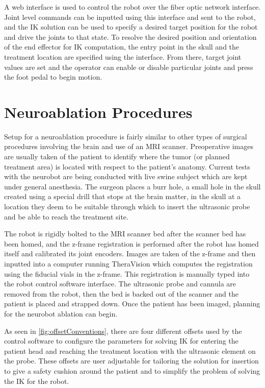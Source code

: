 \documentclass[12pt]{report}
\begin{document}
A web interface is used to control the robot over the fiber optic network interface. Joint level commands can be inputted using this interface and sent to the robot, and the IK solution can be used to specify a desired target position for the robot and drive the joints to that state. To resolve the desired position and orientation of the end effector for IK computation, the entry point in the skull and the treatment location are specified using the interface. From there, target joint values are set and the operator can enable or disable particular joints and press the foot pedal to begin motion.


\section{Neuroablation Procedures}
\label{sec:neuroablationProcedures}
Setup for a neuroablation procedure is fairly similar to other types of surgical procedures involving the brain and use of an MRI scanner. Preoperative images are usually taken of the patient to identify where the tumor (or planned treatment area) is located with respect to the patient's anatomy. Current tests with the neurobot are being conducted with live swine subject which are kept under general anesthesia. The surgeon places a burr hole, a small hole in the skull created using a special drill that stops at the brain matter, in the skull at a location they deem to be suitable through which to insert the ultrasonic probe and be able to reach the treatment site.

The robot is rigidly bolted to the MRI scanner bed after the scanner bed has been homed, and the z-frame registration is performed after the robot has homed itself and calibrated its joint encoders. Images are taken of the z-frame and then inputted into a computer running TheraVision which computes the registration using the fiducial vials in the z-frame. This registration is manually typed into the robot control software interface. The ultrasonic probe and cannula are removed from the robot, then the bed is backed out of the scanner and the patient is placed and strapped down. Once the patient has been imaged, planning for the neurobot ablation can begin.

As seen in \autoref{fig:offsetConventions}, there are four different offsets used by the control software to configure the parameters for solving IK for entering the patient head and reaching the treatment location with the ultrasonic element on the probe. These offsets are user adjustable for tailoring the solution for insertion to give a safety cushion around the patient and to simplify the problem of solving the IK for the robot.
\end{document}
